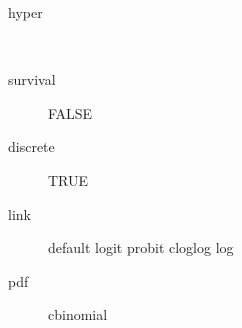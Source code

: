 \begin{description}
	\item[hyper]\ 
	 \item[ survival ] FALSE 
	 \item[ discrete ] TRUE 
	 \item[ link ] default logit probit cloglog log 
	 \item[ pdf ] cbinomial 
\end{description}
